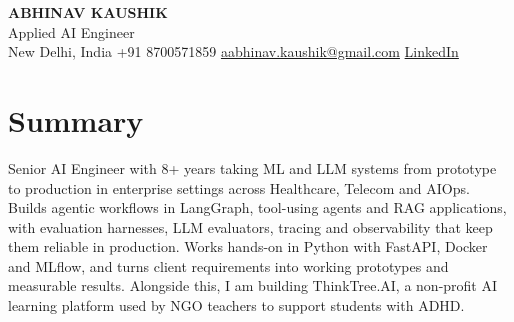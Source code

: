\documentclass[10pt,a4paper]{article}
\begin{document}
\begin{center}
  {\LARGE\bfseries ABHINAV KAUSHIK}\\[2pt]
  {\large Applied AI Engineer}\\[2pt]
  New Delhi, India \textbar{} +91 8700571859 \textbar{} \href{mailto:aabhinav.kaushik@gmail.com}{aabhinav.kaushik@gmail.com} \textbar{} \href{https://www.linkedin.com/in/abhinav-kaushik10/}{LinkedIn}  
\end{center}

\section{Summary}
Senior AI Engineer with 8+ years taking ML and LLM systems from prototype to production in enterprise settings across Healthcare, Telecom and AIOps. Builds agentic workflows in LangGraph, tool-using agents and RAG applications, with evaluation harnesses, LLM evaluators, tracing and observability that keep them reliable in production. Works hands-on in Python with FastAPI, Docker and MLflow, and turns client requirements into working prototypes and measurable results. Alongside this, I am building ThinkTree.AI, a non-profit AI learning platform used by NGO teachers to support students with ADHD.
\end{document}
